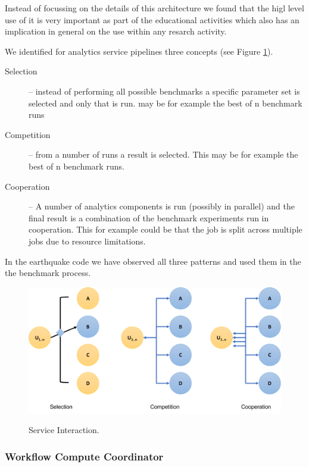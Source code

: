 \documentclass[utf8]{FrontiersinVancouver} %
\begin{document}
Instead of focussing on the details of this architecture we found that
the higl level use of it is very important as part of the educational
activities which also has an implication in general on the use within
any resarch activity.

We identified for analytics service pipelines three concepts (see
Figure \ref{fig:service-interaction}).

\begin{description}
\item [Selection] -- instead of performing all possible benchmarks a
  specific parameter set is selected and only that is run.  may be for
  example the best of n benchmark runs
\item [Competition] -- from a number of runs a result is selected. This
  may be for example the best of n benchmark runs.
\item [Cooperation] -- A number of analytics components is run
  (possibly in parallel) and the final result is a combination of the
  benchmark experiments run in cooperation. This for example could be
  that the job is split across multiple jobs due to resource
  limitations.
\end{description}

In the earthquake code we have observed all three patterns and used
them in the the benchmark process.

\begin{figure}[htb]
\centering\includegraphics[width=0.75\columnwidth]{images/processes-nist.pdf}
\label{fig:service-interaction}
\caption{Service Interaction.}
\end{figure}




\subsubsection{Workflow Compute Coordinator}
\label{sec:workflow-cc}
\end{document}
